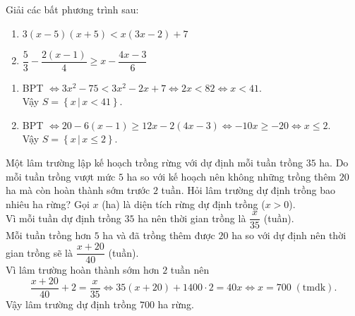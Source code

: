 \begin{ex}%
Giải các bất phương trình sau:
\begin{multicols}{2}
    \begin{enumerate}    
        \item $3(x-5)(x+5)<x(3x-2)+7$
        \item $\dfrac{5}{3}-\dfrac{2(x-1)}{4}\ge x-\dfrac{4x-3}{6}$
    \end{enumerate}
    \end{multicols}
\loigiai
    {
    \begin{enumerate}
        \item BPT $\Leftrightarrow 3x^2-75<3x^2-2x+7\Leftrightarrow 2x<82\Leftrightarrow x<41.$\\ Vậy $S=\left\lbrace x\,|\,x<41\right\rbrace .$
        \item BPT $\Leftrightarrow 20-6(x-1)\ge 12x-2(4x-3)\Leftrightarrow -10x\ge -20\Leftrightarrow x\le 2.$\\ Vậy $S=\left\lbrace x\,|\,x \le 2\right\rbrace .$
    \end{enumerate}
    }
\end{ex}

\begin{ex}%
    Một lâm trường lập kế hoạch trồng rừng với dự định mỗi tuần trồng $35$ ha. Do mỗi tuần trồng vượt mức $5$ ha so với kế hoạch nên không những trồng thêm $20$ ha mà còn hoàn thành sớm trước $2$ tuần. Hỏi lâm trường dự định trồng bao nhiêu ha rừng?
\loigiai
    {Gọi $x$ (ha) là diện tích rừng dự định trồng ($x>0$).\\ Vì mỗi tuần dự định trồng $35$ ha nên thời gian trồng là $\dfrac{x}{35}$ (tuần).\\ Mỗi tuần trồng hơn $5$ ha và đã trồng thêm được $20$ ha so với dự định nên thời gian trồng sẽ là $\dfrac{x+20}{40}$ (tuần).\\ Vì lâm trường hoàn thành sớm hơn $2$ tuần nên $$\dfrac{x+20}{40}+2=\dfrac{x}{35}\Leftrightarrow 35(x+20)+1400\cdot 2=40x\Leftrightarrow x=700 \;(\text{tmdk}).$$
    Vậy lâm trường dự định trồng $700$ ha rừng.
    }
\end{ex}

